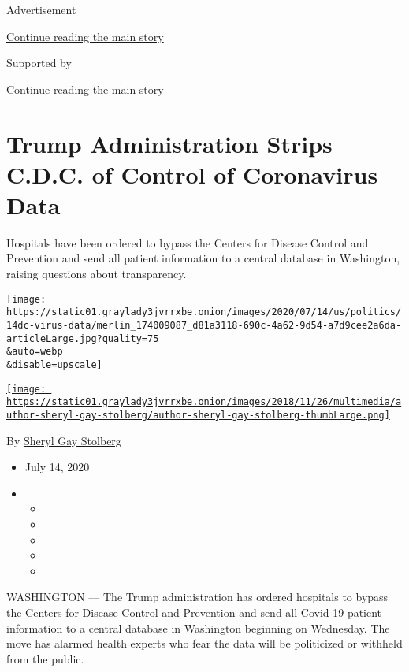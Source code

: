 Advertisement

\protect\hyperlink{after-top}{Continue reading the main story}

Supported by

\protect\hyperlink{after-sponsor}{Continue reading the main story}

\hypertarget{trump-administration-strips-cdc-of-control-of-coronavirus-data}{%
\section{Trump Administration Strips C.D.C. of Control of Coronavirus
Data}\label{trump-administration-strips-cdc-of-control-of-coronavirus-data}}

Hospitals have been ordered to bypass the Centers for Disease Control
and Prevention and send all patient information to a central database in
Washington, raising questions about transparency.

\texttt{[image: https://static01.graylady3jvrrxbe.onion/images/2020/07/14/us/politics/14dc-virus-data/merlin\_174009087\_d81a3118-690c-4a62-9d54-a7d9cee2a6da-articleLarge.jpg?quality=75\\\&auto=webp\\\&disable=upscale]}

\href{https://www.nytimes3xbfgragh.onion/by/sheryl-gay-stolberg}{\texttt{[image: https://static01.graylady3jvrrxbe.onion/images/2018/11/26/multimedia/author-sheryl-gay-stolberg/author-sheryl-gay-stolberg-thumbLarge.png]}}

By
\href{https://www.nytimes3xbfgragh.onion/by/sheryl-gay-stolberg}{Sheryl
Gay Stolberg}

\begin{itemize}
\item
  July 14, 2020
\item
  \begin{itemize}
  \item
  \item
  \item
  \item
  \item
  \end{itemize}
\end{itemize}

WASHINGTON --- The Trump administration has ordered hospitals to bypass
the Centers for Disease Control and Prevention and send all Covid-19
patient information to a central database in Washington beginning on
Wednesday. The move has alarmed health experts who fear the data will be
politicized or withheld from the public.

